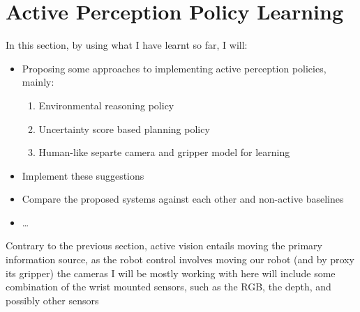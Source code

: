 \chapter{Active Perception Policy Learning}
In this section, by using what I have learnt so far, I will:
  \begin{itemize}
    \item Proposing some approaches to implementing active perception policies, mainly:
      \begin{enumerate}
        \item Environmental reasoning policy
        \item Uncertainty score based planning policy
        \item Human-like separte camera and gripper model for learning
      \end{enumerate}
    \item Implement these suggestions
    \item Compare the proposed systems against each other and non-active baselines
    \item \ldots \todo{}
  \end{itemize}

Contrary to the previous section, active vision entails moving the primary information source, as the robot control involves moving our robot (and by proxy its gripper) the cameras I will be mostly working with here will include some combination of the wrist mounted sensors, such as the RGB, the depth, and possibly other sensors 




  